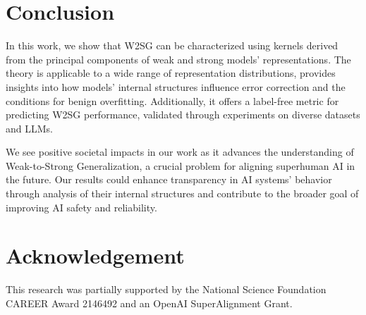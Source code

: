 \section{Conclusion}

In this work, we show that W2SG can be characterized using kernels derived from the principal components of weak and strong models' representations. The theory is applicable to a wide range of representation distributions, provides insights into how models' internal structures influence error correction and the conditions for benign overfitting. Additionally, it offers a label-free metric for predicting W2SG performance, validated through experiments on diverse datasets and LLMs.

We see positive societal impacts in our work as it advances the understanding of Weak-to-Strong Generalization, a crucial problem for aligning superhuman AI in the future. Our results could enhance transparency in AI systems' behavior through analysis of their internal structures and contribute to the broader goal of improving AI safety and reliability.

\section*{Acknowledgement}
This research was partially supported by the National Science Foundation CAREER Award 2146492 and an OpenAI SuperAlignment Grant.









